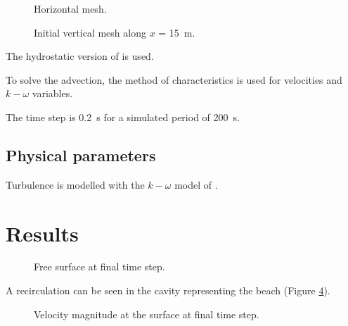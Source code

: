 \begin{figure}[!htbp]
 \centering
 \caption{Horizontal mesh.}
 \label{t3d:plage:fig:meshH}
\end{figure}

\begin{figure}[!htbp]
 \centering
 \caption{Initial vertical mesh along $x$ = 15~m.}
 \label{t3d:plage:fig:meshV}
\end{figure}

The hydrostatic version of  is used.

To solve the advection, the method of characteristics is used for velocities and
$k-\omega$ variables.

The time step is 0.2~s for a simulated period of 200~s.

\subsection{Physical parameters}

Turbulence is modelled with the $k-\omega$ model of .

\section{Results}

\begin{figure}[H]
  \centering
  \caption{Free surface at final time step.}
  \label{t3d:plage:FreeSurf}
\end{figure}

A recirculation can be seen in the cavity representing the beach
(Figure \ref{t3d:plage:Velo}).

\begin{figure}[H]
  \centering
  \caption{Velocity magnitude at the surface at final time step.}
  \label{t3d:plage:Velo}
\end{figure}


